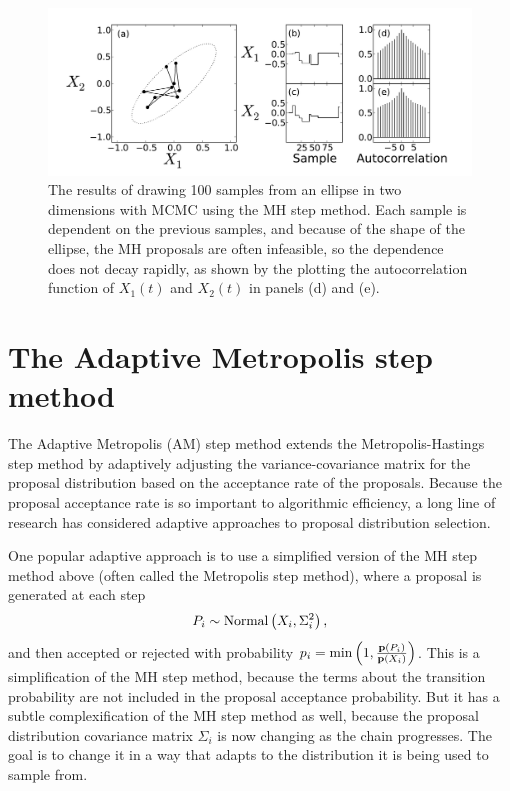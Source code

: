 \begin{figure}[ht]
\begin{center}
\includegraphics[width=\textwidth]{metropolis-ball.pdf}
\caption{The results of drawing 100 samples from an ellipse in two
  dimensions with MCMC using the MH step method.  Each sample is
  dependent on the previous samples, and because of the shape of the
  ellipse, the MH proposals are often infeasible, so the dependence
  does not decay rapidly, as shown by the plotting the autocorrelation
  function of $X_1(t)$ and $X_2(t)$ in panels (d) and (e).}
\label{metropolis-ball}
\end{center}
\end{figure}


\section{The Adaptive Metropolis step method}
The Adaptive Metropolis (AM) step method extends the
Metropolis-Hastings step method by adaptively adjusting the
variance-covariance matrix for the proposal distribution based on the
acceptance rate of the proposals.\cite{Harrio_paper_cited_in_PyMC}
Because the proposal acceptance rate is so important to algorithmic
efficiency, a long line of research has considered adaptive approaches
to proposal distribution selection.\cite{refs_from_harrio_and_others}

One popular adaptive approach is to use a simplified version of the MH
step method above (often called the Metropolis step method), where a
proposal is generated at each step
\[
P_i \sim \operatorname{Normal}\left(X_i, \Sigma^2_i\right),
\]
and then accepted or rejected with probability $p_i = \min\left(1,
\frac{\mathbf{p}(P_i)}{\mathbf{p}(X_i)}\right)$.  This is a simplification of
the MH step method, because the terms about the transition probability
are not included in the proposal acceptance probability.  But it has a
subtle complexification of the MH step method as well, because the
proposal distribution covariance matrix $\Sigma_i$ is now changing
as the chain progresses.  The goal is to change it in a way that
adapts to the distribution it is being used to sample from.

